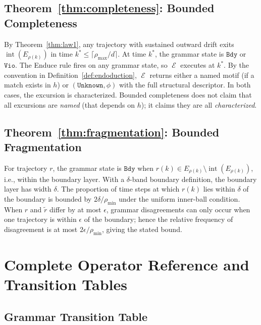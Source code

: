 \documentclass[11pt,a4paper]{article}
\theoremstyle{plain}
\theoremstyle{definition}
\theoremstyle{remark}
\DeclareMathOperator{\Endo}{\mathcal{E}}
\DeclareMathOperator{\interior}{int}
\begin{document}
\subsection*{Theorem~\ref{thm:completeness}: Bounded Completeness}
By Theorem~\ref{thm:law1}, any trajectory with sustained outward drift exits
$\interior(E_{\rho(k)})$ in time $k^* \leq \lceil \rho_{\max}/d \rceil$. At time $k^*$,
the grammar state is $\mathtt{Bdy}$ or $\mathtt{Vio}$. The Enduce rule fires on any grammar
state, so $\Endo$ executes at $k^*$. By the convention in Definition~\ref{def:endoduction},
$\Endo$ returns either a named motif (if a match exists in $h$) or $(\mathtt{Unknown}, \phi)$
with the full structural descriptor. In both cases, the excursion is characterized. Bounded
completeness does not claim that all excursions are \emph{named} (that depends on $h$); it
claims they are all \emph{characterized}.

\subsection*{Theorem~\ref{thm:fragmentation}: Bounded Fragmentation}
For trajectory $r$, the grammar state is $\mathtt{Bdy}$ when
$r(k) \in E_{\rho(k)} \setminus \interior(E_{\rho(k)})$, i.e., within the boundary layer.
With a $\delta$-band boundary definition, the boundary layer has width $\delta$. The proportion
of time steps at which $r(k)$ lies within $\delta$ of the boundary is bounded by
$2\delta / \rho_{\min}$ under the uniform inner-ball condition. When $r$ and $\tilde{r}$ differ
by at most $\epsilon$, grammar disagreements can only occur when one trajectory is within
$\epsilon$ of the boundary; hence the relative frequency of disagreement is at most
$2\epsilon / \rho_{\min}$, giving the stated bound.

\section{Complete Operator Reference and Transition Tables}
\label{app:operator_ref}

\subsection*{Grammar Transition Table}
\end{document}
